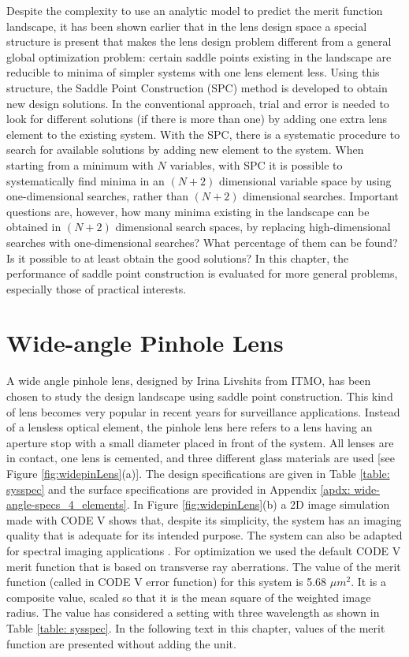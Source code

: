 Despite the complexity to use an analytic model to predict the merit function landscape, it has been shown earlier \cite{BociortSPCSexplained}\cite{MVTurnhoutSPC15} that in the lens design space a special structure is present that makes the lens design problem different from a general global optimization problem: certain saddle points existing in the landscape are reducible to minima of simpler systems with one lens element less. Using this structure, the Saddle Point Construction (SPC) \cite{MVTurnhoutSPC15} method is developed to obtain new design solutions. In the conventional approach, trial and error is needed to look for different solutions (if there is more than one) by adding one extra lens element to the existing system. With the SPC, there is a systematic procedure to search for available solutions by adding new element to the system. When starting from a minimum with $N$ variables, with SPC it is possible to systematically find minima in an $(N+2)$ dimensional variable space by using one-dimensional searches, rather than $(N+2)$ dimensional searches. Important questions are, however, how many minima existing in the landscape can be obtained in $(N+2)$ dimensional search spaces, by replacing high-dimensional searches with one-dimensional searches? What percentage of them can be found? Is it possible to at least obtain the good solutions? In this chapter, the performance of saddle point construction is evaluated for more general problems, especially those of practical interests. 


\section{Wide-angle Pinhole Lens}

A wide angle pinhole lens, designed by Irina Livshits from ITMO, has been chosen to study the design landscape using saddle point construction. This kind of lens becomes very popular in recent years for surveillance applications. Instead of a lensless optical element, the pinhole lens here refers to a lens having an aperture stop with a small diameter placed in front of the system. All lenses are in contact, one lens is cemented, and three different glass materials are used [see Figure \ref{fig:widepinLens}(a)]. The design specifications are given in Table \ref{table: sysspec} and the surface specifications are provided in Appendix \ref{apdx: wide-angle-specs_4_elements}. In Figure \ref{fig:widepinLens}(b) a 2D image simulation made with CODE V shows that, despite its simplicity, the system has an imaging quality that is adequate for its intended purpose. The system can also be adapted for spectral imaging applications \cite{Strauch2015}. For optimization we used the default CODE V merit function that is based on transverse ray aberrations. The value of the merit function (called in CODE V error function) for this system is 5.68 $\mu m^2$. It is a composite value, scaled so that it is the mean square of the weighted image radius. The value has considered a setting with three wavelength as shown in Table \ref{table: sysspec}. In the following text in this chapter, values of the merit function are presented without adding the unit. 

